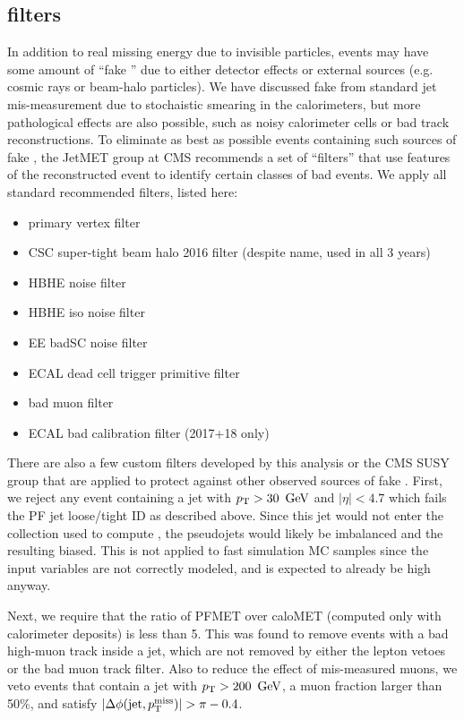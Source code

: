 \subsection{\ptmiss filters}
In addition to real missing energy due to invisible particles, events may have some amount of ``fake \ptmiss'' due to either
detector effects or external sources (e.g. cosmic rays or beam-halo particles). We have discussed fake \ptmiss from 
standard jet mis-measurement due to stochaistic smearing in the calorimeters, but more pathological effects are also possible,
such as noisy calorimeter cells or bad track reconstructions. To eliminate as best as possible events containing such sources
of fake \ptmiss, the JetMET group at CMS recommends a set of ``\ptmiss filters'' that use features of the reconstructed
event to identify certain classes of bad events. We apply all standard recommended filters, listed here:
\begin{itemize}\setlength\itemsep{-1mm}
\item primary vertex filter
\item CSC super-tight beam halo 2016 filter (despite name, used in all 3 years)
\item HBHE noise filter
\item HBHE iso noise filter
\item EE badSC noise filter
\item ECAL dead cell trigger primitive filter
\item bad muon filter
\item ECAL bad calibration filter (2017+18 only)
\end{itemize}

There are also a few custom \ptmiss filters developed by this analysis or the CMS SUSY group that are applied to protect 
against other observed sources of fake \ptmiss.
First, we reject any event containing a jet with $p_{\mathrm{T}}>30~\,\text{Ge\hspace{-.08em}V}$ and $|\eta|<4.7$ which fails the PF jet loose/tight ID as described above.
Since this jet would not enter the collection used to compute \mttwo, the pseudojets would likely be imbalanced and the resulting
\mttwo biased.
This is not applied to fast simulation MC samples since the input variables are not correctly modeled, and \mttwo
is expected to already be high anyway.

Next, we require that the ratio of PFMET over caloMET (\ptmiss computed only with calorimeter deposits) is less than 5.
This was found to remove events with a bad high-\pt muon track inside a jet, which are not removed by either the lepton
vetoes or the bad muon track filter. 
Also to reduce the effect of mis-measured muons, we veto events that contain a jet with $p_{\mathrm{T}}>200~\,\text{Ge\hspace{-.08em}V}$, a muon fraction
larger than 50\%, and satisfy $|\Delta\phi(\mathrm{jet},p_{\mathrm{T}}^{\mathrm{miss}})| > \pi-0.4$.

